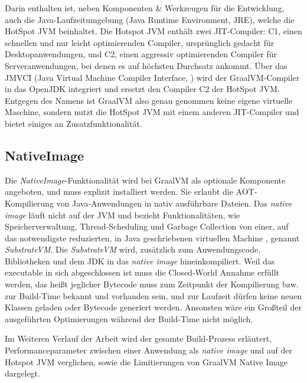  Darin enthalten ist, neben Komponenten \& Werkzeugen für die Entwicklung, auch die Java-Laufzeitumgebung (Java Runtime Environment, JRE), welche die HotSpot JVM beinhaltet.
Die Hotspot JVM enthält zwei JIT-Compiler: C1, einen schnellen und nur leicht optimierenden Compiler, ursprünglich gedacht für Desktopanwendungen, und C2, einen aggressiv optimierenden Compiler für 
Serveranwendungen, bei denen es auf höchsten Durchsatz ankommt\parencite{OracleHotSpot}.
Über das JMVCI (Java Virtual Machine Compiler Interface, \parencite{OpenJDK243}) wird der GraalVM-Compiler in das OpenJDK integriert und ersetzt den Compiler C2 der HotSpot JVM. Entgegen des Namens ist GraalVM
also genau genommen keine eigene virtuelle Maschine, sondern nutzt die HotSpot JVM mit einem anderen JIT-Compiler und bietet einiges an Zusatzfunktionalität.
\newpage
\subsection{NativeImage}
\label{subsec:nativeImage}

Die \textit{NativeImage}-Funktionalität wird bei GraalVM als optionale Komponente angeboten, und muss explizit installiert werden. 
Sie erlaubt die AOT-Kompilierung von Java-Anwendungen in nativ ausführbare Dateien.
Das \textit{native image} läuft nicht auf der JVM und bezieht Funktionalitäten, wie Speicherverwaltung, Thread-Scheduling und Garbage Collection von einer, auf das notwendigste reduzierten, in Java geschriebenen virtuellen Machine
, genannt \textit{SubstrateVM}\parencite{GraalVMNativeImage}. Die \textit{SubstrateVM} wird, zusätzlich zum Anwendungscode, Bibliotheken und dem JDK in das \textit{native image} hineinkompiliert.
Weil das executable in sich abgeschlossen ist muss die Closed-World Annahme erfüllt werden, das heißt jeglicher Bytecode muss zum Zeitpunkt der Kompilierung bzw. zur Build-Time bekannt und vorhanden sein, und 
zur Laufzeit dürfen keine neuen Klassen geladen oder Bytecode generiert werden. Ansonsten wäre ein Großteil der ausgeführten Optimierungen während der Build-Time nicht möglich.

Im Weiteren Verlauf der Arbeit wird der gesamte Build-Prozess erläutert, Performanceparameter zwischen einer Anwendung als \textit{native image} und auf der Hotspot JVM verglichen, sowie die Limitierungen von GraalVM Native Image dargelegt.
